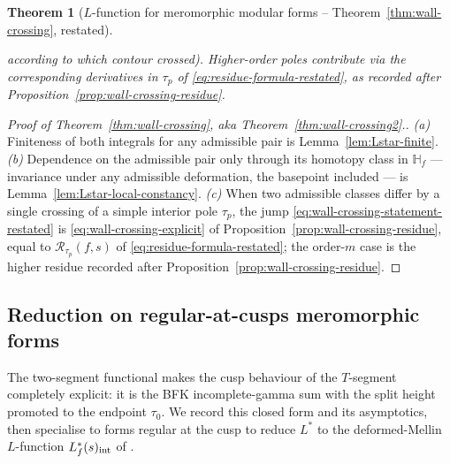 \documentclass[11pt]{article}
\newtheorem{theorem}{Theorem}[section]
\numberwithin{equation}{section}  %
\newcommand{\HH}{\mathbb{H}}
\begin{document}
\begin{theorem}[$L$-function for meromorphic modular forms -- Theorem~\ref{thm:wall-crossing}, restated]
\begin{enumerate}[label=(\alph*),leftmargin=2em]
according to which contour crossed).  Higher-order poles contribute
via the corresponding derivatives in $\tau_p$ of
\eqref{eq:residue-formula-restated}, as recorded after
Proposition~\ref{prop:wall-crossing-residue}.
\end{enumerate}
\end{theorem}%

\begin{proof}[Proof of Theorem~\ref{thm:wall-crossing}, aka Theorem~\ref{thm:wall-crossing2}.]
\emph{(a)} Finiteness of both integrals for any admissible pair is
Lemma~\ref{lem:Lstar-finite}.
\emph{(b)} Dependence on the admissible pair only through its homotopy
class in $\HH_f$ --- invariance under any admissible deformation, the
basepoint included --- is Lemma~\ref{lem:Lstar-local-constancy}.
\emph{(c)} When two admissible classes differ by a single crossing of
a simple interior pole $\tau_p$, the jump
\eqref{eq:wall-crossing-statement-restated} is
\eqref{eq:wall-crossing-explicit} of
Proposition~\ref{prop:wall-crossing-residue}, equal to
$\mathcal{R}_{\tau_p}(f, s)$ of \eqref{eq:residue-formula-restated};
the order-$m$ case is the higher residue recorded after
Proposition~\ref{prop:wall-crossing-residue}.
\end{proof}

\subsection{Reduction on regular-at-cusps meromorphic forms}\label{subsec:reduction-to-int}

The two-segment functional makes the cusp behaviour of the $T$-segment
completely explicit: it is the BFK incomplete-gamma sum with the split
height promoted to the endpoint $\tau_0$.  We record this closed form
and its asymptotics, then specialise to forms regular at the cusp to
reduce $L^*$ to the deformed-Mellin $L$-function $L_f^*(s)_{\rm int}$
of \cite{1806}.
\end{document}
